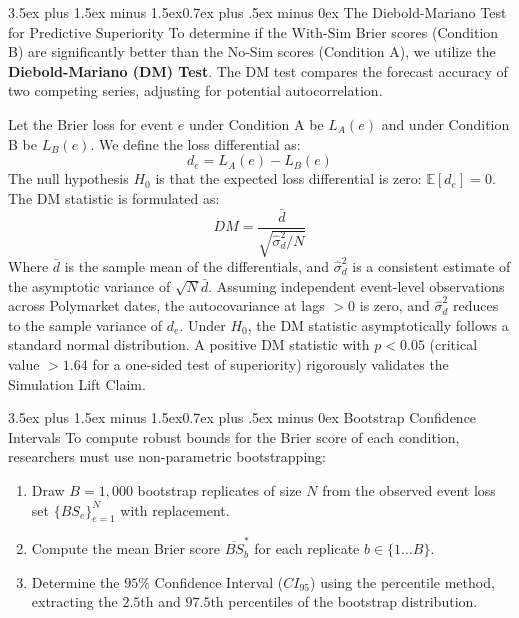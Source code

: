\documentclass[11pt,journal,onecolumn]{IEEEtran}
\makeatletter
\renewcommand\subsection{\@startsection{subsection}{2}{\z@}%
  {3.5ex plus 1.5ex minus 1.5ex}{0.7ex plus .5ex minus 0ex}%
  {\normalfont\normalsize\bfseries}}
\makeatother
\begin{document}
\subsection{The Diebold-Mariano Test for Predictive Superiority}
To determine if the With-Sim Brier scores (Condition B) are significantly better than the No-Sim scores (Condition A), we utilize the \textbf{Diebold-Mariano (DM) Test}. The DM test compares the forecast accuracy of two competing series, adjusting for potential autocorrelation. 

Let the Brier loss for event $e$ under Condition A be $L_A(e)$ and under Condition B be $L_B(e)$. We define the loss differential as:
\begin{equation}
    d_e = L_A(e) - L_B(e)
\end{equation}
The null hypothesis $H_0$ is that the expected loss differential is zero: $\mathbb{E}[d_e] = 0$. The DM statistic is formulated as:
\begin{equation}
    DM = \frac{\bar{d}}{\sqrt{\hat{\sigma}_d^2 / N}}
\end{equation}
Where $\bar{d}$ is the sample mean of the differentials, and $\hat{\sigma}_d^2$ is a consistent estimate of the asymptotic variance of $\sqrt{N}\bar{d}$. Assuming independent event-level observations across Polymarket dates, the autocovariance at lags $>0$ is zero, and $\hat{\sigma}_d^2$ reduces to the sample variance of $d_e$. Under $H_0$, the DM statistic asymptotically follows a standard normal distribution. A positive DM statistic with $p < 0.05$ (critical value $> 1.64$ for a one-sided test of superiority) rigorously validates the Simulation Lift Claim.

\subsection{Bootstrap Confidence Intervals}
To compute robust bounds for the Brier score of each condition, researchers must use non-parametric bootstrapping:
\begin{enumerate}
    \item Draw $B = 1,000$ bootstrap replicates of size $N$ from the observed event loss set $\{BS_e\}_{e=1}^N$ with replacement.
    \item Compute the mean Brier score $\overline{BS}^*_b$ for each replicate $b \in \{1 \dots B\}$.
    \item Determine the $95\%$ Confidence Interval ($CI_{95}$) using the percentile method, extracting the $2.5\text{th}$ and $97.5\text{th}$ percentiles of the bootstrap distribution.
\end{enumerate}
\end{document}

